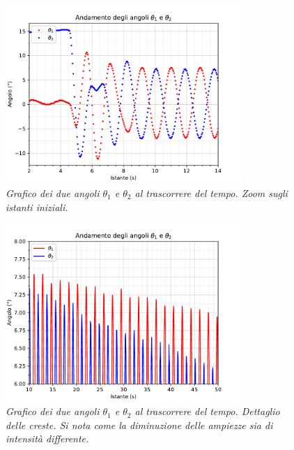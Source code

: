 \documentclass[11pt, a4paper, twoside]{article}
\begin{document}
\begin{figure}[h!]
  \centering
  \includegraphics[width=0.8\textwidth]{../../media/plot/angles_accurate.pdf}
  \caption{\textit{Grafico dei due angoli $\theta_1$ e $\theta_2$ al trascorrere del tempo. Zoom sugli istanti iniziali.} }
  \label{anlges_accurate}
\end{figure}

\begin{figure}[h!]
  \centering
  \includegraphics[width=0.8\textwidth]{../../media/plot/angles_decrease.pdf}
  \caption{\textit{Grafico dei due angoli $\theta_1$ e $\theta_2$
  al trascorrere del tempo. Dettaglio delle creste. Si nota come la diminuzione delle ampiezze
  sia di intensità differente.} }
  \label{angles_decrease}
\end{figure}
\end{document}
